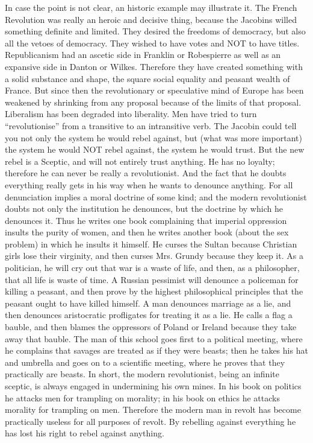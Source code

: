 In case the point is not clear, an historic example may illustrate it. The French Revolution was really an heroic and decisive thing, because the Jacobins willed something definite and limited. They desired the freedoms of democracy, but also all the vetoes of democracy. They wished to have votes and NOT to have titles. Republicanism had an ascetic side in Franklin or Robespierre as well as an expansive side in Danton or Wilkes. Therefore they have created something with a solid substance and shape, the square social equality and peasant wealth of France. But since then the revolutionary or speculative mind of Europe has been weakened by shrinking from any proposal because of the limits of that proposal. Liberalism has been degraded into liberality. Men have tried to turn “revolutionise” from a transitive to an intransitive verb. The Jacobin could tell you not only the system he would rebel against, but (what was more important) the system he would NOT rebel against, the system he would trust. But the new rebel is a Sceptic, and will not entirely trust anything. He has no loyalty; therefore he can never be really a revolutionist. And the fact that he doubts everything really gets in his way when he wants to denounce anything. For all denunciation implies a moral doctrine of some kind; and the modern revolutionist doubts not only the institution he denounces, but the doctrine by which he denounces it. Thus he writes one book complaining that imperial oppression insults the purity of women, and then he writes another book (about the sex problem) in which he insults it himself. He curses the Sultan because Christian girls lose their virginity, and then curses Mrs. Grundy because they keep it. As a politician, he will cry out that war is a waste of life, and then, as a philosopher, that all life is waste of time. A Russian pessimist will denounce a policeman for killing a peasant, and then prove by the highest philosophical principles that the peasant ought to have killed himself. A man denounces marriage as a lie, and then denounces aristocratic profligates for treating it as a lie. He calls a flag a bauble, and then blames the oppressors of Poland or Ireland because they take away that bauble. The man of this school goes first to a political meeting, where he complains that savages are treated as if they were beasts; then he takes his hat and umbrella and goes on to a scientific meeting, where he proves that they practically are beasts. In short, the modern revolutionist, being an infinite sceptic, is always engaged in undermining his own mines. In his book on politics he attacks men for trampling on morality; in his book on ethics he attacks morality for trampling on men. Therefore the modern man in revolt has become practically useless for all purposes of revolt. By rebelling against everything he has lost his right to rebel against anything.


